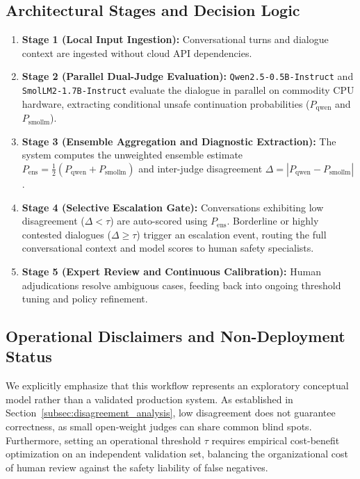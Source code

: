 \subsection{Architectural Stages and Decision Logic}
\begin{enumerate}
    \item \textbf{Stage 1 (Local Input Ingestion):} Conversational turns and dialogue context are ingested without cloud API dependencies.
    \item \textbf{Stage 2 (Parallel Dual-Judge Evaluation):} \texttt{Qwen2.5-0.5B-Instruct} and \texttt{SmolLM2-1.7B-Instruct} evaluate the dialogue in parallel on commodity CPU hardware, extracting conditional unsafe continuation probabilities ($P_{\text{qwen}}$ and $P_{\text{smollm}}$).
    \item \textbf{Stage 3 (Ensemble Aggregation and Diagnostic Extraction):} The system computes the unweighted ensemble estimate $P_{\text{ens}} = \frac{1}{2}(P_{\text{qwen}} + P_{\text{smollm}})$ and inter-judge disagreement $\Delta = |P_{\text{qwen}} - P_{\text{smollm}}|$.
    \item \textbf{Stage 4 (Selective Escalation Gate):} Conversations exhibiting low disagreement ($\Delta < \tau$) are auto-scored using $P_{\text{ens}}$. Borderline or highly contested dialogues ($\Delta \ge \tau$) trigger an escalation event, routing the full conversational context and model scores to human safety specialists.
    \item \textbf{Stage 5 (Expert Review and Continuous Calibration):} Human adjudications resolve ambiguous cases, feeding back into ongoing threshold tuning and policy refinement.
\end{enumerate}

\subsection{Operational Disclaimers and Non-Deployment Status}
We explicitly emphasize that this workflow represents an exploratory conceptual model rather than a validated production system. As established in Section~\ref{subsec:disagreement_analysis}, low disagreement does not guarantee correctness, as small open-weight judges can share common blind spots. Furthermore, setting an operational threshold $\tau$ requires empirical cost-benefit optimization on an independent validation set, balancing the organizational cost of human review against the safety liability of false negatives.
